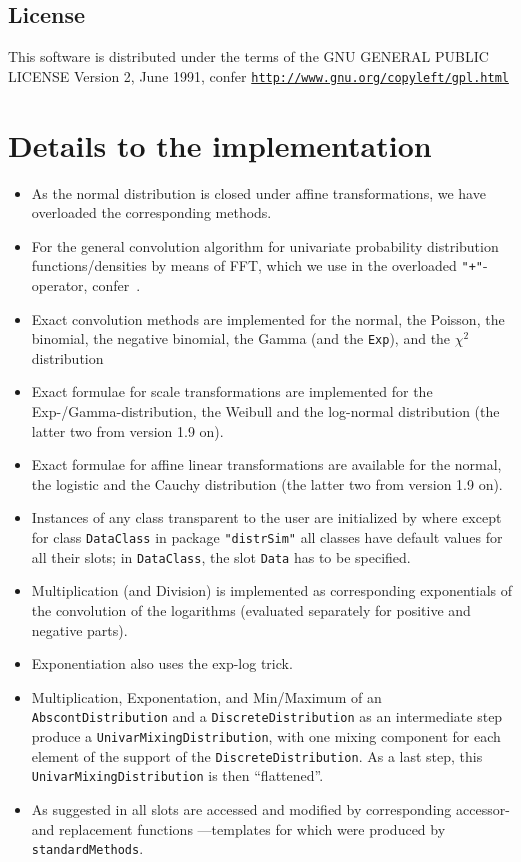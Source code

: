 \documentclass[11pt]{article}
\newcommand{\code}[1]{{\tt #1}}
\newcommand{\pkg}[1]{{\tt "#1"}}
\begin{document}
\subsection{License}
This software is distributed under the terms of the GNU GENERAL
PUBLIC LICENSE Version 2, June 1991, confer\newline
\href{http://www.gnu.org/copyleft/gpl.html}%
{\footnotesize \tt http://www.gnu.org/copyleft/gpl.html}

\section{Details to the implementation}
\begin{itemize}
\item As the normal distribution is closed under affine transformations, we have 
overloaded the corresponding methods. 
\item For the general convolution algorithm for univariate probability 
distribution functions/densities by means of FFT, which we use in the 
overloaded {\tt "+"}-operator, confer~\cite{K:R:S:04}.
\item Exact convolution methods are implemented for the normal, the Poisson, 
the binomial, the negative binomial, the Gamma (and the \code{Exp}), and 
the {$\chi^2$} distribution
\item Exact formulae for scale transformations are implemented for 
the Exp-/Gamma-distribution, the Weibull and the log-normal distribution
(the latter two from version 1.9 on). 
\item Exact formulae for affine linear transformations are available for
the normal, the logistic and the Cauchy distribution (the latter two from
version 1.9 on).  
\item Instances of any class transparent to the user are initialized 
by
where except for class \code{DataClass} in package \pkg{distrSim} all classes 
have default values for all their slots; in \code{DataClass},
the slot \code{Data} has to be specified.
\item Multiplication (and Division) is implemented as corresponding
exponentials of the convolution of the logarithms (evaluated separately
for positive and negative parts).
\item Exponentiation also uses the exp-log trick.
\item Multiplication, Exponentation, and Min/Maximum of an \code{AbscontDistribution}
and a \code{DiscreteDistribution} as an intermediate step produce
a \code{UnivarMixingDistribution}, with one mixing component for each element
of the support of the \code{DiscreteDistribution}. As a last step,
this \code{UnivarMixingDistribution} is then ``flattened''.
\item
As suggested in \cite{OOPGent} all slots are accessed and modified by 
corresponding accessor- and replacement functions ---templates for which were 
produced by \code{standardMethods}.


\end{itemize}
\end{document}
